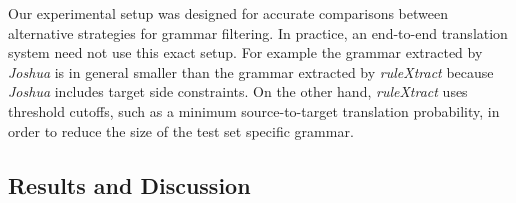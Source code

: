 Our experimental setup was designed for accurate comparisons between alternative
strategies for grammar filtering. In practice, an end-to-end translation
system need not use this exact setup. For example the grammar extracted by \emph{Joshua} is
in general smaller than the grammar extracted by \emph{ruleXtract} because \emph{Joshua}
includes target side constraints. On the other hand, \emph{ruleXtract} uses threshold
cutoffs, such as a minimum source-to-target translation probability, %
in order to reduce the size of the test set specific grammar.

\subsection{Results and Discussion}


